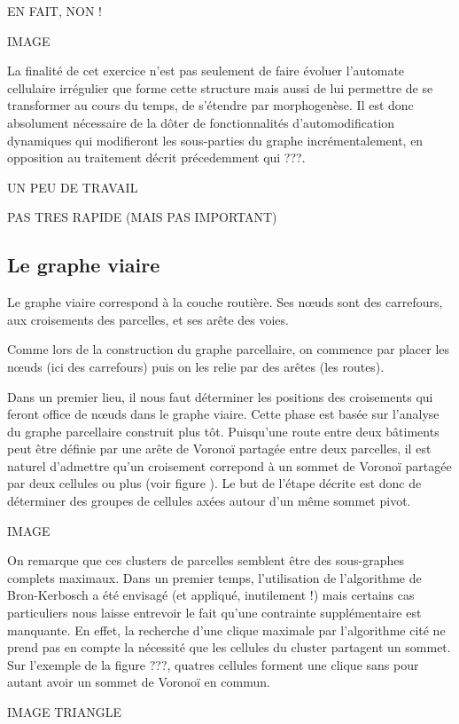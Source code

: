 \documentclass[12pt]{article}
\begin{document}
EN FAIT, NON !

IMAGE

La finalité de cet exercice n'est pas seulement de faire évoluer
l'automate cellulaire irrégulier que forme cette structure mais aussi
de lui permettre de se transformer au cours du temps, de s'étendre par
morphogenèse. Il est donc absolument nécessaire de la dôter de
fonctionnalités d'automodification dynamiques qui modifieront les
sous-parties du graphe incrémentalement, en opposition au traitement
décrit précedemment qui ???.

UN PEU DE TRAVAIL

PAS TRES RAPIDE (MAIS PAS IMPORTANT)

\subsection{Le graphe viaire}

Le graphe viaire correspond à la couche routière. Ses n\oe uds sont
des carrefours, aux croisements des parcelles, et ses arête des voies.

Comme lors de la construction du graphe parcellaire, on commence par
placer les n\oe uds (ici des carrefours) puis on les relie par des
arêtes (les routes).

Dans un premier lieu, il nous faut déterminer les positions des
croisements qui feront office de n\oe uds dans le graphe viaire. Cette
phase est basée sur l'analyse du graphe parcellaire construit plus
tôt. Puisqu'une route entre deux bâtiments peut être définie par une
arête de Voronoï partagée entre deux parcelles, il est naturel
d'admettre qu'un croisement correpond à un sommet de Voronoï partagée
par deux cellules ou plus (voir figure ). Le but de l'étape décrite
est donc de déterminer des groupes de cellules axées autour d'un même
sommet pivot.

IMAGE

On remarque que ces clusters de parcelles semblent être des
sous-graphes complets maximaux. Dans un premier temps, l'utilisation
de l'algorithme de Bron-Kerbosch a été envisagé (et appliqué,
inutilement !) mais certains cas particuliers nous laisse entrevoir
le fait qu'une contrainte supplémentaire est manquante. En effet, la
recherche d'une clique maximale par l'algorithme cité ne prend pas en
compte la nécessité que les cellules du cluster partagent un
sommet. Sur l'exemple de la figure ???, quatres cellules forment une
clique sans pour autant avoir un sommet de Voronoï en commun.

IMAGE TRIANGLE
\end{document}
